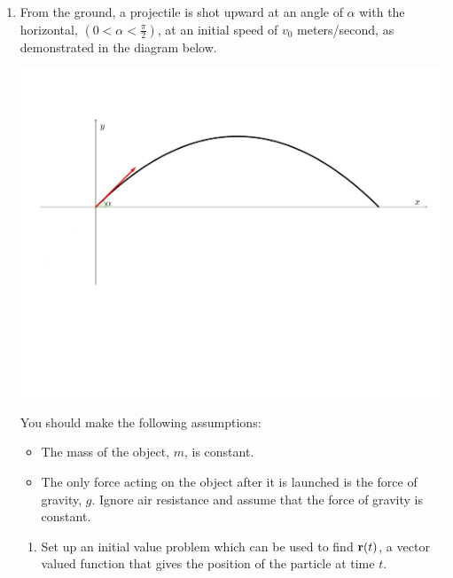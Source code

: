 \documentclass[12pt]{article}
\newif\ifans
\begin{document}
\begin{enumerate}
\item From the ground, a projectile is shot upward at an angle of $\alpha$ with the horizontal, $\left(0<\alpha<\frac{\pi}{2}\right)$, at an initial speed of $v_0$ meters/second, as demonstrated in the diagram below.

\begin{center}
\includegraphics[scale=0.5]{projectile.pdf}
\end{center}

You should make the following assumptions:

\begin{itemize}

\item The mass of the object, $m$, is constant.

\item The only force acting on the object after it is launched is the force of gravity, $g$.  Ignore air resistance and assume that the force of gravity is constant.

\end{itemize}

\begin{enumerate}

\item Set up an initial value problem which can be used to find ${\bf r}(t)$, a vector valued function that gives the position of the particle at time $t$.

\ifans{\fbox{$\left\{\begin{array}{l}
{\bf a}(t)=\frac{d^2{\bf r}}{dt^2}=\langle 0, -g \rangle\\
\\
{\bf v}(0)={\bf r}^{\prime}(0)=\langle v_0\cos{\alpha}, v_0\sin{\alpha} \rangle\\
\\
{\bf r}(0)= \langle 0,0 \rangle\end{array}\right.$}} \fi


\end{enumerate}
\end{enumerate}
\end{document}
